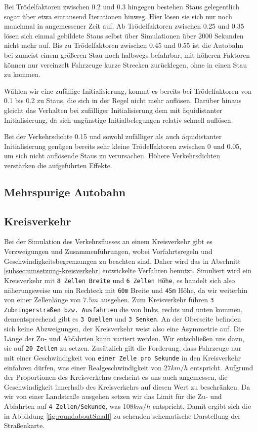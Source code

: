 \documentclass[10pt, a4paper]{article}
\begin{document}
Bei Trödelfaktoren zwischen 0.2 und 0.3 hingegen bestehen Staus gelegentlich sogar über etwa eintausend Iterationen hinweg. Hier lösen sie sich nur noch manchmal in angemessener Zeit auf. Ab Trödelfaktoren zwischen 0.25 und 0.35 lösen sich einmal gebildete Staus selbst über Simulationen über 2000 Sekunden nicht mehr auf. Bis zu Trödelfaktoren zwischen 0.45 und 0.55 ist die Autobahn bei zumeist einem größeren Stau noch halbwegs befahrbar, mit höheren Faktoren können nur vereinzelt Fahrzeuge kurze Strecken zurücklegen, ohne in einen Stau zu kommen.

Wählen wir eine zufällige Initialisierung, kommt es bereits bei Trödelfaktoren von 0.1 bis 0.2 zu Staus, die sich in der Regel nicht mehr auflösen. Darüber hinaus gleicht das Verhalten bei zufälliger Initialisierung dem mit äquidistanter Initialisierung, da sich ungünstige Initialbelegungen relativ schnell auflösen.

Bei der Verkehrsdichte 0.15 und sowohl zufälliger als auch äquidistanter Initialisierung genügen bereits sehr kleine Trödelfaktoren zwischen 0 und 0.05, um sich nicht auflösende Staus zu verursachen. Höhere Verkehrsdichten verstärken die aufgeführten Effekte.

\subsection{Mehrspurige Autobahn}
\label{subsec:mehrspurig}

\subsection{Kreisverkehr}
\label{subsec:kreisverkehr}
Bei der Simulation des Verkehrsflusses an einem Kreisverkehr gibt es Verzweigungen und Zusammenführungen, wobei Vorfahrtsregeln und Geschwindigkeitsbegrenzungen zu beachten sind. Daher wird das in Abschnitt \ref{subsec:umsetzung-kreisverkehr} entwickelte Verfahren benutzt. Simuliert wird ein Kreisverkehr mit \texttt{8 Zellen Breite} und \texttt{6 Zellen Höhe}, es handelt sich also näherungsweise um ein Rechteck mit \texttt{60m} Breite und \texttt{45m} Höhe, da wir weiterhin von einer Zellenlänge von $7.5m$ ausgehen. Zum Kreisverkehr führen \texttt{3 Zubringerstraßen bzw. Ausfahrten} die von links, rechts und unten kommen, dementsprechend gibt es \texttt{3 Quellen} und \texttt{3 Senken}. An der Oberseite befinden sich keine Abzweigungen, der Kreisverkehr weist also eine Asymmetrie auf. Die Länge der Zu- und Abfahrten kann variiert werden. Wir entschließen uns dazu, sie auf \texttt{20 Zellen} zu setzen. Zusätzlich gilt die Forderung, dass Fahrzeuge nur mit einer Geschwindigkeit von \texttt{einer Zelle pro Sekunde} in den Kreisverkehr einfahren dürfen, was einer Realgeschwindigkeit von $27km/h$ entspricht. Aufgrund der Proportionen des Kreisverkehrs erscheint es uns auch angemessen, die Geschwindigkeit innerhalb des Kreisverkehrs auf diesen Wert zu beschränken. Da wir von einer Landstraße ausgehen setzen wir das Limit für die Zu- und Abfahrten auf \texttt{4 Zellen/Sekunde}, was $108km/h$ entspricht. Damit ergibt sich die in Abbildung \ref{fig:roundaboutSmall} zu sehenden schematische Darstellung der Straßenkarte.
\end{document}
